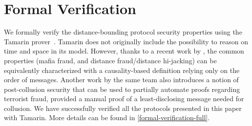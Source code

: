 \section{Formal Verification}\label{formal-verification}

We formally verify the distance-bounding protocol security properties using the Tamarin
prover~\cite{meier2013tamarin}. Tamarin does not originally include
the possibility to reason on time and space in its model.  However,
thanks to a recent work by \textcite{TamarinDB}, the common properties
(mafia fraud, and distance fraud/distance hi-jacking) can be equivalently 
characterized with a causality-based definition relying only on the order
of messages.
Another work by the same team \textcite{TamarinDBTF} also introduces a
notion of post-collusion security that can be used to partially automate
proofs regarding terrorist fraud, provided a manual proof of a least-disclosing
message needed for collusion.
We have successfully verified all the protocols presented in this paper with 
Tamarin.
More details can be found in \cref{formal-verification-full}.
